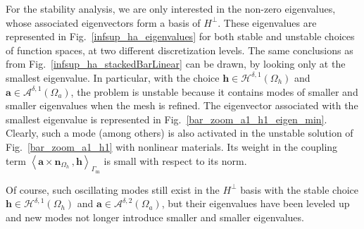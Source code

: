 \documentclass[journal]{IEEEtran}
\renewcommand{\vec}[1]{\boldsymbol{#1}} %
\newcommand{\parenangle}[1]{\left\langle#1\right\rangle}
\newcommand{\surInt}[3]{\parenangle{#1 \, , #2}_{#3}}
\renewcommand{\a}{\vec a}
\newcommand{\n}{\vec n}
\newcommand{\h}{\vec h}
\newcommand{\Oa}{\Omega_a}
\newcommand{\Oh}{\Omega_h}
\newcommand{\Gm}{\Gamma_\text{m}}
\newcommand{\hspdone}{\mathcal{H}^{\delta,1}}
\newcommand{\aspdone}{\mathcal{A}^{\delta,1}}
\newcommand{\aspdtwo}{\mathcal{A}^{\delta,2}}
\begin{document}
For the stability analysis, we are only interested in the non-zero eigenvalues, whose associated eigenvectors form a basis of $H^\perp$. These eigenvalues are represented in Fig.~\ref{infsup_ha_eigenvalues} for both stable and unstable choices of function spaces, at two different discretization levels. The same conclusions as from Fig.~\ref{infsup_ha_stackedBarLinear} can be drawn, by looking only at the smallest eigenvalue. In particular, with the choice $\h\in \hspdone(\Oh)$ and $\a\in \aspdone(\Oa)$, the problem is unstable because it contains modes of smaller and smaller eigenvalues when the mesh is refined. The eigenvector associated with the smallest eigenvalue is represented in Fig.~\ref{bar_zoom_a1_h1_eigen_min}. Clearly, such a mode (among others) is also activated in the unstable solution of Fig.~\ref{bar_zoom_a1_h1} with nonlinear materials. Its weight in the coupling term $\surInt{\a\times\n_{\Oh}}{\h}{\Gm}$ is small with respect to its norm.

Of course, such oscillating modes still exist in the $H^\perp$ basis with the stable choice $\h\in \hspdone(\Oh)$ and $\a\in \aspdtwo(\Oa)$, but their eigenvalues have been leveled up and new modes not longer introduce smaller and smaller eigenvalues.
\end{document}
